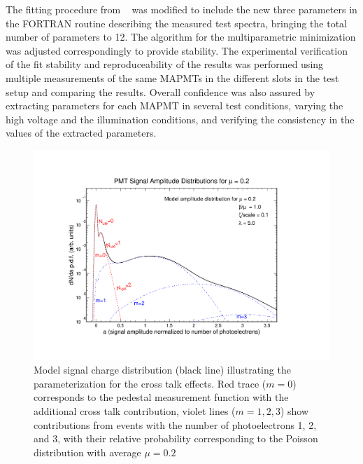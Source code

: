 The fitting procedure from ~\cite{DEGTIARENKO20171} was modified to include the new three parameters in the FORTRAN routine describing the measured test spectra, bringing the total number of parameters to 12. The algorithm for the multiparametric minimization was adjusted correspondingly to provide stability. The experimental verification of the fit stability and reproduceability of the results was performed using multiple measurements of the same MAPMTs in the different slots in the test setup and comparing the results. Overall confidence was also assured by extracting parameters for each MAPMT in several test conditions, varying the high voltage and the illumination conditions, and verifying the consistency in the values of the extracted parameters. 

\begin{figure}[t]
	\centering
	\includegraphics[trim=90 60 110 100, clip, width=\linewidth]{figures/model.pdf}
	\caption{Model signal charge distribution (black line) illustrating the parameterization for the cross talk effects. Red trace ($m = 0$) corresponds to the pedestal measurement function with the additional cross talk contribution, violet lines ($m = 1, 2, 3$) show contributions from events with the number of photoelectrons 1, 2, and 3, with their relative probability corresponding to the Poisson distribution with average $\mu = 0.2$  }
	\label{fig:Model}
\end{figure}
